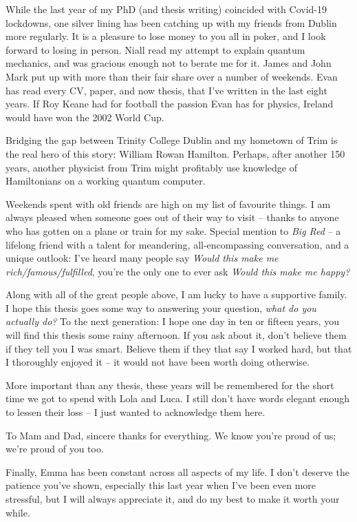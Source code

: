 While the last year of my PhD (and thesis writing) coincided with Covid-19 lockdowns, 
    one silver lining has been catching up with my friends from Dublin more regularly. 
It is a pleasure to lose money to you all in poker, and I look forward to losing in person. 
Niall read my attempt to explain quantum mechanics, 
    and was gracious enough not to berate me for it. 
James and John Mark put up with more than their fair share over a number of weekends. 
Evan has read every CV, paper, and now thesis, that I've written in the last eight years. 
If Roy Keane had for football the passion Evan has for physics, 
    Ireland would have won the 2002 World Cup.
\par 

Bridging the gap between Trinity College Dublin and my hometown of Trim is the real hero of this story:
    William Rowan Hamilton. 
Perhaps, after another 150 years, another physicist from Trim might profitably use knowledge of 
    Hamiltonians on a working quantum computer.
\par 

Weekends spent with old friends are high on my list of favourite things. 
I am always pleased when someone goes out of their way to visit -- 
    thanks to anyone who has gotten on a plane or train for my sake. 
Special mention to \emph{Big Red} -- a lifelong friend with a talent for 
    meandering, all-encompassing conversation, and a unique outlook:
    I've heard many people say \emph{Would this make me rich/famous/fulfilled}, 
    you're the only one to ever ask \emph{Would this make me happy?}
\par 

Along with all of the great people above, 
    I am lucky to have a supportive family. 
I hope this thesis goes some way to answering your question, 
    \emph{what do you actually do?} 
To the next generation: 
    I hope one day in ten or fifteen years, you will find this thesis some rainy afternoon. 
If you ask about it, don't believe them if they tell you I was smart. 
Believe them if they that say I worked hard, but that I thoroughly enjoyed it -- it would not have been worth doing otherwise. 
\par 
More important than any thesis, these years will be remembered for 
    the short time we got to spend with Lola and Luca. 
I still don't have words elegant enough to lessen their loss -- I just wanted to acknowledge them here. 
\par 

To Mam and Dad, sincere thanks for everything. 
We know you're proud of us; 
    we're proud of you too. 
\par 
Finally, Emma has been constant across all aspects of my life.
I don't deserve the patience you've shown, especially this last year when I've been even more stressful, 
    but I will always appreciate it, and do my best to make it worth your while.  